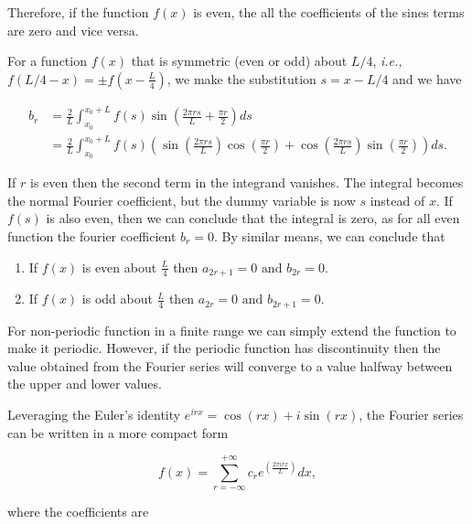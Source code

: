 \documentclass[english,a4paper,12pt]{report}
\begin{document}
Therefore, if the function \(f(x)\) is even, the all the coefficients of the sines terms are zero and vice versa. 

For a function \(f(x)\) that is symmetric (even or odd) about \(L /4 \), \textit{i.e.,} \(f(L /4-x ) = \pm f(x - \frac{L}{4} )\), we make the substitution \(s = x-L /4 \) and we have 

\begin{equation}
    \begin{aligned} 
    b_{r} &= \frac{2}{L} \int_{x_0 }^{x_0 + L} f(s) \sin \left( \frac{2 \pi rs}{L} + \frac{\pi r}{2} \right) ds \\ &= \frac{2}{L} \int_{x_0 }^{x_0 + L} f(s) \left( \sin \left( \frac{2 \pi  rs}{L}  \right) \cos \left( \frac{\pi r}{2}  \right) + \cos \left( \frac{2 \pi rs}{L}  \right) \sin \left( \frac{\pi r}{2} \right)\right) ds.        
    \end{aligned} 
\end{equation}

If \(r\) is even then the second term in the integrand vanishes. The integral becomes the normal Fourier coefficient, but the dummy variable is now \(s\) instead of \(x\). If \(f(s)\) is also even, then we can conclude that the integral is zero, as for all even function the fourier coefficient \(b_{r} = 0\). By similar means, we can conclude that 

\begin{enumerate}
    \item If \(f(x)\) is even about \(\frac{L}{4} \) then \(a_{2r+1} = 0 \text { and } b_{2r} = 0 \).
    \item If \(f(x)\) is odd about \(\frac{L}{4} \) then \(a_{2r} = 0 \text { and } b_{2r+1} = 0 \).      
\end{enumerate}

For non-periodic function in a finite range we can simply extend the function to make it periodic. However, if the periodic function has discontinuity then the value obtained from the Fourier series will converge to a value halfway between the upper and lower values.

Leveraging the Euler's identity \(e^{irx} = \cos (rx) + i\sin (rx) \), the Fourier series can be written in a more compact form

\begin{equation}
    f(x) = \sum_{r=-\infty}^{+\infty} c_{r} e^{\left( \frac{2\pi i rx}{L}  \right)}dx,  
\end{equation}

where the coefficients are 
\end{document}
